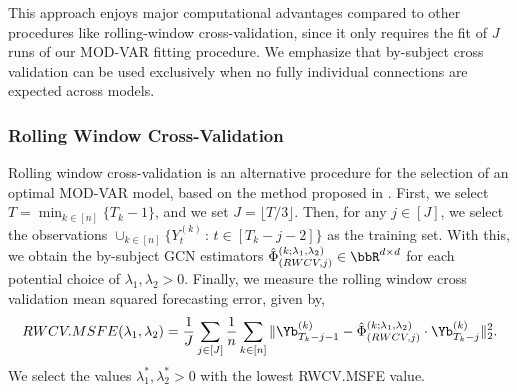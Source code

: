 This approach enjoys major computational advantages compared to other procedures like rolling-window cross-validation, since it only requires the fit of $J$ runs of our MOD-VAR fitting procedure. We emphasize that by-subject cross validation can be used exclusively when no fully individual connections are expected across models. %


\subsubsection{Rolling Window Cross-Validation}

Rolling window cross-validation is an alternative procedure for the selection of an optimal MOD-VAR model, based on the method proposed in \citep{nicholson2017varx}. First, we select $T =  \min_{k\in[n]}\{ T_k-1 \}$, and we set $J = \lfloor  T / 3 \rfloor$. Then, for any $j \in [J]$, we select the observations $\cup_{k\in[n]}\{Y^{(k)}_{t}\,:\, t\in [T_k - j - 2]\}$ as the training set. With this, we obtain the by-subject GCN estimators $\hat\Phi^{(k;\lambda_1,\lambda_2)}_{(RWCV,j)}\in\bbR^{d\times d}$ for each potential choice of $\lambda_1,\lambda_2> 0$. Finally, we measure the rolling window cross validation mean squared forecasting error, given by,
\begin{equation*}
	RWCV.MSFE(\lambda_1, \lambda_2) = \frac{1}{J}\sum_{j\in[J]} \frac{1}{n} \sum_{k\in[n]}\| \Yb^{(k)}_{T_k - j - 1} -  \hat\Phi^{(k;\lambda_1,\lambda_2)}_{(RWCV,j)} \cdot \Yb^{(k)}_{T_k - j} \|_2^2.
\end{equation*}
We select the values  $\lambda_1^*, \lambda_2^*>0$ with the lowest RWCV.MSFE value. 

